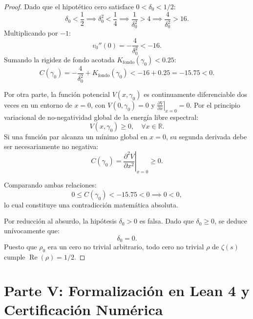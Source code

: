 \documentclass[11pt,a4paper]{article}
\theoremstyle{definition}
\theoremstyle{remark}
\begin{document}
\begin{proof}
Dado que el hipotético cero satisface $0 < \delta_0 < 1/2$:
\begin{equation}
\delta_0 < \frac{1}{2} \implies \delta_0^2 < \frac{1}{4} \implies \frac{1}{\delta_0^2} > 4 \implies \frac{4}{\delta_0^2} > 16.
\end{equation}
Multiplicando por $-1$:
\begin{equation}
v_0''(0) = -\frac{4}{\delta_0^2} < -16.
\end{equation}
Sumando la rigidez de fondo acotada $K_{\text{fondo}}(\gamma_0) < 0.25$:
\begin{equation}
C(\gamma_0) = -\frac{4}{\delta_0^2} + K_{\text{fondo}}(\gamma_0) < -16 + 0.25 = -15.75 < 0.
\end{equation}

Por otra parte, la función potencial $V(x, \gamma_0)$ es continuamente diferenciable dos veces en un entorno de $x = 0$, con $V(0, \gamma_0) = 0$ y $\left.\frac{\partial V}{\partial x}\right|_{x=0} = 0$. Por el principio variacional de no-negatividad global de la energía libre espectral:
\begin{equation}
V(x, \gamma_0) \ge 0, \quad \forall x \in \mathbb{R}.
\end{equation}
Si una función par alcanza un mínimo global en $x = 0$, su segunda derivada debe ser necesariamente no negativa:
\begin{equation}
C(\gamma_0) = \left. \frac{\partial^2 V}{\partial x^2} \right|_{x=0} \ge 0.
\end{equation}

Comparando ambas relaciones:
\begin{equation}
0 \le C(\gamma_0) < -15.75 < 0 \implies 0 < 0,
\end{equation}
lo cual constituye una contradicción matemática absoluta.

Por reducción al absurdo, la hipótesis $\delta_0 > 0$ es falsa. Dado que $\delta_0 \ge 0$, se deduce unívocamente que:
\begin{equation}
\delta_0 = 0.
\end{equation}
Puesto que $\rho_0$ era un cero no trivial arbitrario, todo cero no trivial $\rho$ de $\zeta(s)$ cumple $\operatorname{Re}(\rho) = 1/2$.
\end{proof}

\section{Parte V: Formalización en Lean 4 y Certificación Numérica}
\end{document}
